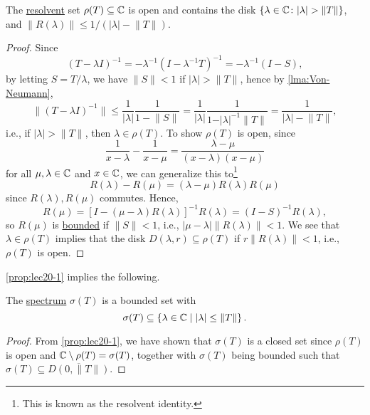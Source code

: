 \begin{proposition}\label{prop:lec20-1}
	The \hyperref[def:regular-point]{resolvent} set \(\rho (T)\subseteq \mathbb{\MakeUppercase{c}} \) is open and contains the disk \(\left\{ \lambda \in \mathbb{\MakeUppercase{c}} \colon \vert \lambda  \vert > \lVert T \rVert  \right\} \), and \(\lVert R(\lambda ) \rVert \leq 1 / (\vert \lambda  \vert - \lVert T \rVert )\).
\end{proposition}
\begin{proof}
	Since
	\[
		(T-\lambda I)^{-1}
		= - \lambda ^{-1} (I-\lambda ^{-1} T)^{-1}
		= - \lambda ^{-1} (I-S),
	\]
	by letting \(S = T / \lambda \), we have \(\lVert S \rVert < 1\) if \(\vert \lambda \vert > \lVert T \rVert \), hence by \autoref{lma:Von-Neumann},
	\[
		\lVert (T-\lambda I)^{-1} \rVert
		\leq \frac{1}{\vert \lambda  \vert } \frac{1}{1 - \lVert S \rVert }
		= \frac{1}{\vert \lambda  \vert } \frac{1}{1 - \vert \lambda  \vert^{-1} \lVert T \rVert  }
		= \frac{1}{\vert \lambda  \vert - \lVert T \rVert },
	\]
	i.e., if \(\vert \lambda  \vert > \lVert T \rVert \), then \(\lambda \in \rho (T)\). To show \(\rho (T)\) is open, since
	\[
		\frac{1}{x - \lambda } - \frac{1}{x-\mu } = \frac{\lambda -\mu }{(x-\lambda )(x-\mu )}
	\]
	for all \(\mu , \lambda \in \mathbb{\MakeUppercase{c}} \) and \(x\in \mathbb{\MakeUppercase{c}} \), we can generalize this to\footnote{This is known as the resolvent identity.}
	\[
		R(\lambda ) - R(\mu ) = (\lambda -\mu )R(\lambda )R(\mu )
	\]
	since \(R(\lambda ), R(\mu )\) commutes. Hence,
	\[
		R(\mu )
		= \left[ I-(\mu -\lambda )R(\lambda ) \right] ^{-1} R(\lambda )
		= (I-S)^{-1} R(\lambda ),
	\]
	so \(R(\mu )\) is \hyperref[rmk:bounded-op]{bounded} if \(\lVert S \rVert < 1\), i.e., \(\vert \mu -\lambda  \vert \lVert R(\lambda ) \rVert < 1\). We see that \(\lambda \in \rho (T)\) implies that the disk \(D(\lambda , r) \subseteq \rho (T)\) if \(r \lVert R(\lambda ) \rVert < 1\), i.e., \(\rho (T)\) is open.
\end{proof}

\autoref{prop:lec20-1} implies the following.

\begin{proposition}\label{prop:lec20-2}
	The \hyperref[def:spectrum-point]{spectrum} \(\sigma (T)\) is a bounded set with
	\[
		\sigma (T) \subseteq \left\{ \lambda \in \mathbb{\MakeUppercase{c}} \mid \vert \lambda \vert \leq \lVert T \rVert \right\}.
	\]
\end{proposition}
\begin{proof}
	From \autoref{prop:lec20-1}, we have shown that \(\sigma (T)\) is a closed set since \(\rho (T)\) is open and \(\mathbb{\MakeUppercase{c}} \setminus \rho (T) = \sigma (T)\), together with \(\sigma (T)\) being bounded such that \(\sigma (T) \subseteq \overline{D(0, \lVert T \rVert )}\).
\end{proof}

